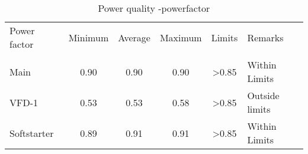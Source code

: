 \begin{table}[!htb]
	\caption{Power quality -powerfactor}
	\label{tbl_ch04_elecaudit_powerquality_powerfactor}
	{\scriptsize
	\begin{tabular}{l|l|l|l|l|l}
		\hline
		Power factor & \multicolumn{1}{c|}{Minimum} & \multicolumn{1}{c|}{Average} & \multicolumn{1}{c|}{Maximum} & \multicolumn{1}{c|}{Limits} & Remarks \\ 
		& \multicolumn{1}{c|}{} & \multicolumn{1}{c|}{} & \multicolumn{1}{c|}{} & \multicolumn{1}{c|}{} &  \\ 
		\hline
		Main  & \multicolumn{1}{c|}{0.90} & \multicolumn{1}{c|}{0.90} & \multicolumn{1}{c|}{0.90} & \multicolumn{1}{c|}{>0.85} & Within  Limits \\ 
		\hline
		VFD-1 & \multicolumn{1}{c|}{0.53} & \multicolumn{1}{c|}{0.53} & \multicolumn{1}{c|}{0.58} & \multicolumn{1}{c|}{>0.85} & Outside limits \\ 
		\hline
		Softstarter & \multicolumn{1}{c|}{0.89} & \multicolumn{1}{c|}{0.91} & \multicolumn{1}{c|}{0.91} & \multicolumn{1}{c|}{>0.85} & Within  Limits \\ 
		\hline
	\end{tabular}	
	
	}%
\end{table}